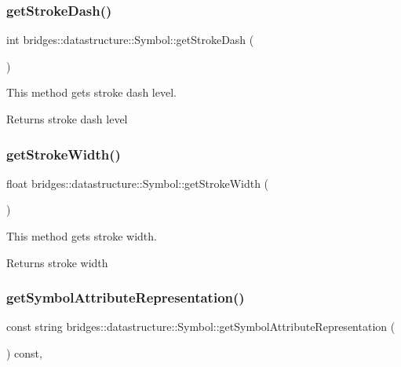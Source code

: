\subsubsection{\texorpdfstring{get\+Stroke\+Dash()}{getStrokeDash()}}
{\footnotesize\ttfamily int bridges\+::datastructure\+::\+Symbol\+::get\+Stroke\+Dash (\begin{DoxyParamCaption}{ }\end{DoxyParamCaption})\hspace{0.3cm}{\ttfamily [inline]}}



This method gets stroke dash level. 

\begin{DoxyReturn}{Returns}
stroke dash level 
\end{DoxyReturn}
\mbox{\label{classbridges_1_1datastructure_1_1_symbol_a4274feed56b8dfe89ffa3f791ece2ebd}} 
\subsubsection{\texorpdfstring{get\+Stroke\+Width()}{getStrokeWidth()}}
{\footnotesize\ttfamily float bridges\+::datastructure\+::\+Symbol\+::get\+Stroke\+Width (\begin{DoxyParamCaption}{ }\end{DoxyParamCaption})\hspace{0.3cm}{\ttfamily [inline]}}



This method gets stroke width. 

\begin{DoxyReturn}{Returns}
stroke width 
\end{DoxyReturn}
\mbox{\label{classbridges_1_1datastructure_1_1_symbol_ab9a92e73867a95e8cc3e63cad75d266a}} 
\subsubsection{\texorpdfstring{get\+Symbol\+Attribute\+Representation()}{getSymbolAttributeRepresentation()}}
{\footnotesize\ttfamily const string bridges\+::datastructure\+::\+Symbol\+::get\+Symbol\+Attribute\+Representation (\begin{DoxyParamCaption}{ }\end{DoxyParamCaption}) const\hspace{0.3cm}{\ttfamily [inline]}, {\ttfamily [protected]}}



